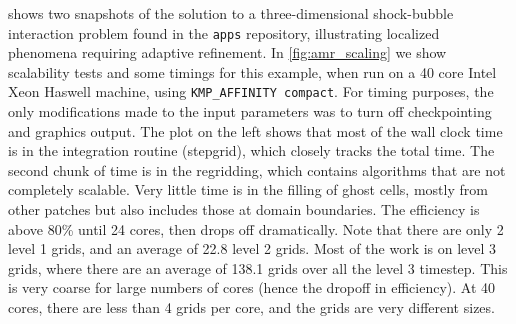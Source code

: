  shows two snapshots of the solution to a
three-dimensional shock-bubble
interaction problem found in the \clawpack \texttt{apps} repository,
illustrating localized phenomena requiring adaptive refinement.
In \cref{fig:amr_scaling} we show scalability tests and some timings for
this example, when run on a 40 core Intel Xeon Haswell machine, using
\texttt{KMP\_AFFINITY compact}.
For timing purposes, the only modifications made to the input parameters was to turn
off checkpointing and graphics output.
The plot on the left shows that most of the wall clock time is in the integration
routine (stepgrid), which closely tracks the total time.
The second chunk of time is in the regridding, which contains algorithms that are not
completely scalable. Very little time is in the filling of ghost cells, mostly from
other patches but also includes those at domain boundaries.
The efficiency is above 80\% until 24 cores, then drops off dramatically.
Note that there are only 2 level 1 grids, and an average of 22.8 level 2 grids. Most of
the work is on level 3 grids, where there are an average of 138.1 grids over all the
level 3 timestep.  This is very coarse
for large numbers of cores (hence the dropoff in efficiency). At 40 cores, there are
less than 4 grids per core, and the grids are very different sizes.

